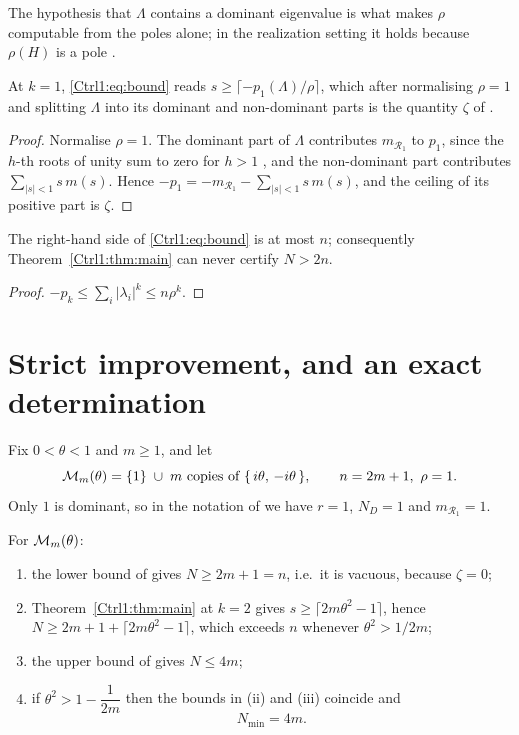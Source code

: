 The hypothesis that $\Lambda$ contains a dominant eigenvalue is what makes $\rho$ computable
from the poles alone; in the realization setting it holds because $\rho(H)$ is a pole
\cite[Lem.~7]{BF04}.

\begin{proposition}[$k=1$ is Benvenuti's $\zeta$]\label{Ctrl1:prop:k1}
At $k=1$, \eqref{Ctrl1:eq:bound} reads $s\ge\lceil-p_1(\Lambda)/\rho\rceil$, which after
normalising $\rho=1$ and splitting $\Lambda$ into its dominant and non-dominant parts is
the quantity $\zeta$ of {\rm\cite[Thm.~4.7]{Ben20ELA}}.
\end{proposition}

\begin{proof}
Normalise $\rho=1$. The dominant part of $\Lambda$ contributes $m_{\mathcal R_1}$ to
$p_1$, since the $h$-th roots of unity sum to zero for $h>1$
\cite[proof of Thm.~4.7]{Ben20ELA}, and the non-dominant part contributes
$\sum_{|s|<1}s\,m(s)$. Hence $-p_1=-m_{\mathcal R_1}-\sum_{|s|<1}s\,m(s)$, and the ceiling
of its positive part is $\zeta$.
\end{proof}

\begin{proposition}\label{Ctrl1:prop:ceiling}
The right-hand side of \eqref{Ctrl1:eq:bound} is at most $n$; consequently
Theorem~\ref{Ctrl1:thm:main} can never certify $N>2n$.
\end{proposition}

\begin{proof}
$-p_k\le\sum_i|\lambda_i|^{k}\le n\rho^{k}$.
\end{proof}

\section{Strict improvement, and an exact determination}\label{Ctrl1:sec:improve}

Fix $0<\theta<1$ and $m\ge1$, and let
\[
\M_m(\theta)=\{1\}\;\cup\;m\ \text{copies of}\ \{\,i\theta,\,-i\theta\,\},
\qquad n=2m+1,\ \rho=1 .
\]
Only $1$ is dominant, so in the notation of \cite{Ben20ELA} we have $r=1$,
$N_D=1$ and $m_{\mathcal R_1}=1$.

\begin{theorem}\label{Ctrl1:thm:improve}
For $\mathcal{M}_m(\theta)$:
\begin{enumerate}
\item[(i)] the lower bound of {\rm\cite[Thm.~4.7]{Ben20ELA}} gives $N\ge 2m+1=n$, i.e.\ it is
vacuous, because $\zeta=0$;
\item[(ii)] Theorem~\ref{Ctrl1:thm:main} at $k=2$ gives
$s\ge\lceil 2m\theta^{2}-1\rceil$, hence $N\ge 2m+1+\lceil2m\theta^{2}-1\rceil$, which
exceeds $n$ whenever $\theta^{2}>1/2m$;
\item[(iii)] the upper bound of {\rm\cite[Thm.~4.4]{Ben20ELA}} gives $N\le 4m$;
\item[(iv)] if $\theta^{2}>1-\dfrac{1}{2m}$ then the bounds in (ii) and (iii) coincide and
\[
N_{\min}=4m .
\]
\end{enumerate}
\end{theorem}

